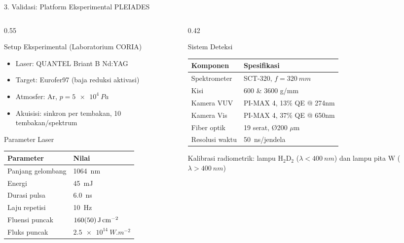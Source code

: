 \documentclass[aspectratio=169, 10pt]{beamer}
\begin{document}
\begin{frame}{3. Validasi: Platform Eksperimental PLEIADES}
  \begin{columns}[T]
    \begin{column}{0.55\textwidth}
      \begin{block}{Setup Eksperimental (Laboratorium CORIA)}
        \begin{itemize}\small
          \item Laser: QUANTEL Briant B Nd:YAG
          \item Target: Eurofer97 (baja reduksi aktivasi)
          \item Atmosfer: Ar, $p = \SI{5e4}{Pa}$
          \item Akuisisi: sinkron per tembakan, 10 tembakan/spektrum
        \end{itemize}
      \end{block}
      \vspace{4pt}
      \begin{exampleblock}{Parameter Laser}
        \small
        \begin{tabular}{ll}
          \toprule
          Parameter & Nilai \\
          \midrule
          Panjang gelombang & \SI{1064}{nm} \\
          Energi & \SI{45}{mJ} \\
          Durasi pulsa & \SI{6.0}{ns} \\
          Laju repetisi & \SI{10}{Hz} \\
          Fluensi puncak & $\SI{160\pm50}{J.cm^{-2}}$ \\
          Fluks puncak & $\SI{2.5e14}{W.m^{-2}}$ \\
          \bottomrule
        \end{tabular}
      \end{exampleblock}
    \end{column}
    \begin{column}{0.42\textwidth}
      \begin{block}{Sistem Deteksi}
        \small
        \begin{tabular}{ll}
          \toprule
          Komponen & Spesifikasi \\
          \midrule
          Spektrometer & SCT-320, $f=\SI{320}{mm}$ \\
          Kisi & 600 \& 3600 g/mm \\
          Kamera VUV & PI-MAX 4, 13\% QE @ 274nm \\
          Kamera Vis & PI-MAX 4, 37\% QE @ 650nm \\
          Fiber optik & 19 serat, \O{}200 $\mu$m \\
          Resolusi waktu & \SI{50}{ns}/jendela \\
          \bottomrule
        \end{tabular}
      \end{block}
      \vspace{4pt}
      {\scriptsize Kalibrasi radiometrik: lampu H$_2$D$_2$ ($\lambda<\SI{400}{nm}$) dan lampu pita W ($\lambda>\SI{400}{nm}$)}
    \end{column}
  \end{columns}
\end{frame}
\end{document}
